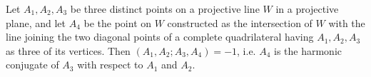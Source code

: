 Let $A_1, A_2, A_3$ be three distinct points on a projective line $W$ in a projective plane, and let $A_4$ be the point on $W$ constructed as the intersection of $W$ with the line joining the two diagonal points of a complete quadrilateral having $A_1, A_2, A_3$ as three of its vertices. Then $(A_1, A_2; A_3, A_4) = -1$, i.e. $A_4$ is the harmonic conjugate of $A_3$ with respect to $A_1$ and $A_2$.